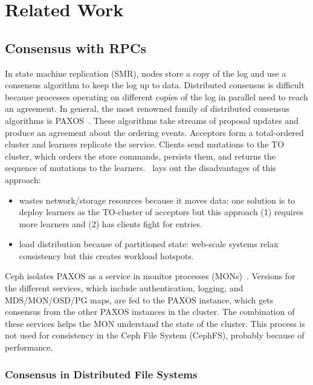 \documentclass[conference]{acm_proc_article-sp} \usepackage[english]{babel}
\begin{document}
\section{Related Work}
\label{related-work} 

\subsection{Consensus with RPCs}

In state machine replication (SMR), nodes store a copy of the log and use a
consensus algorithm to keep the log up to data. Distributed consensus is
difficult because processes operating on different copies of the log in
parallel need to reach an agreement. In general, the most renowned family of
distributed consensus algorithms is PAXOS~\cite{PAXOS}. These algorithms take
streams of proposal updates and produce an agreement about the ordering events.
Acceptors form a total-ordered cluster and learners replicate the service.
Clients send mutations to the TO cluster, which orders the store commands,
persists them, and returns the sequence of mutations to the
learners.~\cite{malkhi:sigops12-paxos} lays out the disadvantages of this
approach:

\begin{itemize}
	\item wastes network/storage resources because it moves data: one solution
    is to deploy learners as the TO-cluster of acceptors but this approach 
    (1) requires more learners and (2) has clients fight for entries.
    \item load distribution because of partitioned state: web-scale systems relax 
    consistency but this creates workload hotspots.  
\end{itemize}

Ceph isolates PAXOS as a service in monitor processes (MONs)~\cite{website:ceph-mon}. Versions for the different services, which include authentication, logging, and MDS/MON/OSD/PG maps, are fed to the PAXOS instance, which gets consensus from the other PAXOS instances in the cluster. The combination of these services helps the MON understand the state of the cluster. This process is not used for consistency in the Ceph File System (CephFS), probably because of performance.

\subsubsection{Consensus in Distributed File Systems}
\end{document}
